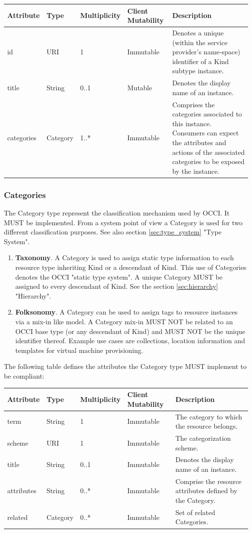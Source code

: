\documentclass[10pt,a4paper]{article}
\begin{document}
\begin{tabular}{l|l|l|l|p{2.7in}}
Attribute & Type & Multiplicity & Client Mutability & Description \\
\hline
id & URI & 1 & Immutable & Denotes a unique (within the service provider's name-space) identifier of a Kind subtype instance. \\
title & String & 0..1 & Mutable & Denotes the display name of an instance. \\
categories & Category & 1..* & Immutable & Comprises the categories associated to this instance. Consumers can expect the attributes and actions of the associated categories to be exposed by the instance. \\
\end{tabular}

\subsubsection{Categories}
The Category type represent the classification mechanism used by OCCI. It MUST be implemented. From a system point of view a Category is used for two different classification purposes. See also section \ref{sec:type_system} "Type System".

\begin{enumerate}
	\item \textbf{Taxonomy}. A Category is used to assign static type information to each resource type inheriting Kind or a descendant of Kind. This use of Categories denotes the OCCI "static type system". A unique Category MUST be assigned to every descendant of Kind. See the section \ref{sec:hierarchy} "Hierarchy".
	\item \textbf{Folksonomy}. A Category can be used to assign tags to resource instances via a mix-in like model. A Category mix-in MUST NOT be related to an OCCI base type (or any descendant of Kind) and MUST NOT be the unique identifier thereof. Example use cases are collections, location information and templates for virtual machine provisioning.
\end{enumerate}

The following table defines the attributes the Category type MUST implement to be compliant:

\begin{tabular}{l|l|l|l|p{2.7in}}
Attribute & Type & Multiplicity & Client Mutability & Description \\
\hline
term & String & 1 & Immutable & The category to which the resource belongs. \\
scheme & URI & 1 & Immutable & The categorization scheme. \\
title & String & 0..1 & Immutable & Denotes the display name of an instance. \\
attributes & String & 0..* & Immutable & Comprise the resource attributes defined by the Category. \\
related & Category & 0..* & Immutable & Set of related Categories. \\
\end{tabular}
\end{document}

